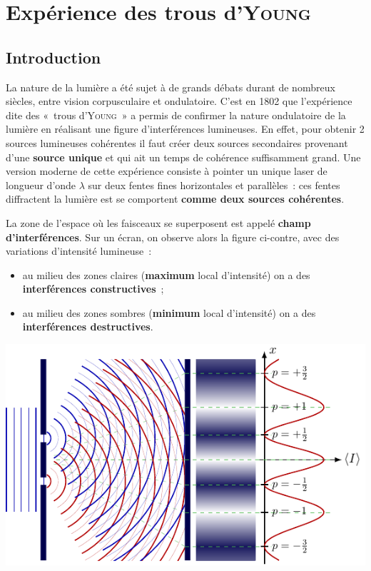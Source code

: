 \documentclass[../../main/main.tex]{subfiles}
\begin{document}
\section{Expérience des trous d'\textsc{Young}}
\subsection{Introduction}

La nature de la lumière a été sujet à de grands débats durant de nombreux
siècles, entre vision corpusculaire et ondulatoire. C'est en 1802 que
l'expérience dite des «~trous d'\textsc{Young}~» a permis de confirmer la nature
ondulatoire de la lumière en réalisant une figure d'interférences
lumineuses.
\bigbreak
En effet, pour obtenir 2 sources lumineuses cohérentes il faut créer deux
sources secondaires provenant d'une \textbf{source unique} et qui ait un temps
de cohérence suffisamment grand. Une version moderne de cette expérience
consiste à pointer un unique laser de longueur d'onde $\lambda$ sur deux fentes
fines horizontales et parallèles~: ces fentes diffractent la lumière est se
comportent \textbf{comme deux sources cohérentes}.
\bigbreak
\noindent
\begin{minipage}{0.45\linewidth}
	La zone de l'espace où les faisceaux se superposent est appelé \textbf{champ
		d'interférences}. Sur un écran, on observe alors la figure ci-contre, avec
	des variations d'intensité lumineuse~:
	\begin{itemize}
		\item au milieu des zones claires (\textbf{maximum} local d'intensité)
		      on a des \textbf{interférences constructives}~;
		\item au milieu des zones sombres (\textbf{minimum} local d'intensité)
		      on a des \textbf{interférences destructives}.
	\end{itemize}
\end{minipage}
\hfill
\begin{minipage}{0.50\linewidth}
	\begin{center}
		\includegraphics[width=\linewidth]{young_result}
	\end{center}
\end{minipage}
\end{document}

